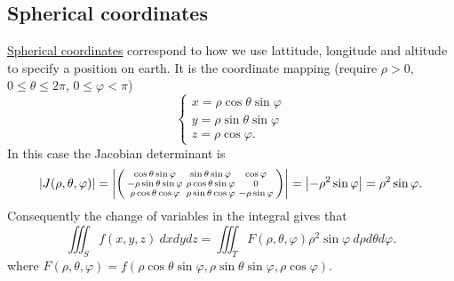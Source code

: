 \subsection*{Spherical coordinates}

\href{https://en.wikipedia.org/wiki/Spherical_coordinate_system}{Spherical coordinates} correspond to how we use lattitude, longitude and altitude to specify a position on earth.
It is the coordinate mapping (require \(\rho>0\), \(0\leq \theta \leq 2\pi\), \(0\leq \varphi <\pi\))
\[
    \begin{cases}
        x = \rho \cos \theta \sin \varphi \\
        y = \rho \sin \theta \sin \varphi \\
        z = \rho \cos \varphi.
    \end{cases}
\]
In this case the Jacobian determinant is
\[
    \left|J(\rho,\theta,\varphi)\right|
    =
    \left|\left(\begin{smallmatrix}
            \cos \theta \sin \varphi       & \sin \theta \sin \varphi      & \cos \varphi        \\
            -\rho \sin \theta \sin \varphi & \rho \cos \theta \sin \varphi & 0                   \\
            \rho \cos \theta \cos \varphi  & \rho \sin \theta \cos \varphi & - \rho \sin \varphi
        \end{smallmatrix}\right)\right|
    =
    \left|- \rho^2 \sin \varphi\right|
    = \rho^2 \sin \varphi.
\]
Consequently the change of variables in the integral gives that
\[
    \iiint_{S} f(x,y,z) \ dx dy dz =  \iiint_{T}  F(\rho,\theta,\varphi) \rho^2 \sin \varphi  \ d\rho d\theta d\varphi.
\]
where \(F(\rho,\theta,\varphi) = f(\rho \cos \theta \sin \varphi, \rho \sin \theta \sin \varphi,   \rho \cos \varphi  ) \).

\bookletend
